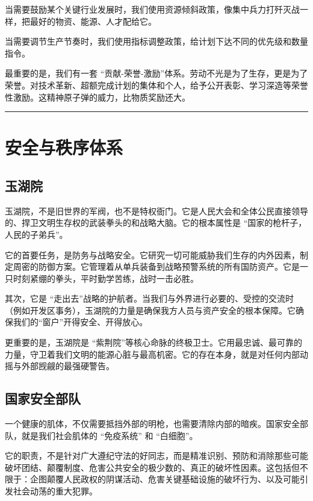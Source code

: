当需要鼓励某个关键行业发展时，我们使用资源倾斜政策，像集中兵力打歼灭战一样，把最好的物资、能源、人才配给它。

当需要调节生产节奏时，我们使用指标调整政策，给计划下达不同的优先级和数量指令。

最重要的是，我们有一套 ``贡献-荣誉-激励''体系。劳动不光是为了生存，更是为了荣誉。对技术革新、超额完成计划的集体和个人，给予公开表彰、学习深造等荣誉性激励。这精神原子弹的威力，比物质奖励还大。

\begin{center}\rule{0.5\linewidth}{0.5pt}\end{center}

\section{安全与秩序体系}\label{ux5b89ux5168ux4e0eux79e9ux5e8fux4f53ux7cfb}

\subsection{玉湖院}\label{ux7389ux6e56ux9662}

玉湖院，不是旧世界的军阀，也不是特权衙门。它是人民大会和全体公民直接领导的、捍卫文明生存权的武装拳头的和战略大脑。它的根本属性是 ``国家的枪杆子，人民的子弟兵''。

它的首要任务，是防务与战略安全。它研究一切可能威胁我们生存的内外因素，制定周密的防御方案。它管理着从单兵装备到战略预警系统的所有国防资产。它是一只时刻紧绷的拳头，平时勤学苦练，战时一击必胜。

其次，它是 ``走出去''战略的护航者。当我们与外界进行必要的、受控的交流时（例如开发区事务），玉湖院的力量是确保我方人员与资产安全的根本保障。它确保我们的``窗户''开得安全、开得放心。

更重要的是，玉湖院是 ``紫荆院''等核心命脉的终极卫士。它用最忠诚、最可靠的力量，守卫着我们文明的能源心脏与最高机密。它的存在本身，就是对任何内部动摇与外部觊觎的最强硬警告。

\subsection{国家安全部队}\label{ux56fdux5bb6ux5b89ux5168ux90e8ux961f}

一个健康的肌体，不仅需要抵挡外部的明枪，也需要清除内部的暗疾。国家安全部队，就是我们社会肌体的 ``免疫系统'' 和 ``白细胞''。

它的职责，不是针对广大遵纪守法的好同志，而是精准识别、预防和消除那些可能破坏团结、颠覆制度、危害公共安全的极少数的、真正的破坏性因素。这包括但不限于：企图颠覆人民政权的阴谋活动、危害关键基础设施的破坏行为、以及可能引发社会动荡的重大犯罪。

